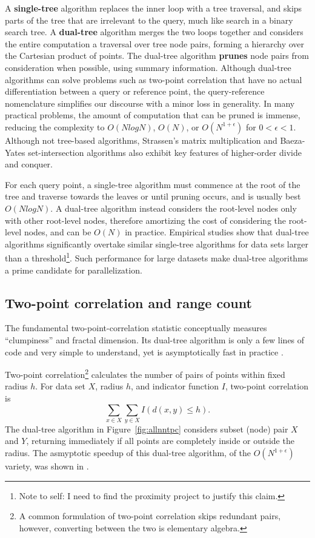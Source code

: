 \documentclass[twoside,leqno,twocolumn]{article}
\newcommand{\authornote}[1]{\footnote{Note to self: #1}}
\newcommand{\authorsnote}[1]{\authornote{#1}}
\newcommand{\fig}[1]{Figure~\ref{fig:#1}}
\newcommand{\mysub}[1]{\subsection{#1} }
\newcommand{\defterm}[1]{{\bf #1}}
\begin{document}
A \defterm{single-tree} algorithm replaces the inner loop with a tree traversal, and skips parts of the tree that are irrelevant to the query, much like search in a binary search tree.
A \defterm{dual-tree} algorithm merges the two loops together and considers the entire computation a traversal over tree node pairs, forming a hierarchy over the Cartesian product of points.
The dual-tree algorithm \defterm{prunes} node pairs from consideration when possible, using summary information.
Although dual-tree algorithms can solve problems such as two-point correlation that have no actual differentiation between a query or reference point, the query-reference nomenclature simplifies our discourse with a minor loss in generality.
In many practical problems, the amount of computation that can be pruned is immense, reducing the complexity to $O(N log N)$, $O(N)$, or $O(N^{1+\epsilon})$ for $0 < \epsilon < 1$.
Although not tree-based algorithms, Strassen's\cite{strassen} matrix multiplication and Baeza-Yates\cite{baeza_yates} set-intersection algorithms also exhibit key features of higher-order divide and conquer.

For each query point, a single-tree algorithm must commence at the root of the tree and traverse towards the leaves or until pruning occurs, and is usually best $O(N log N)$.
A dual-tree algorithm instead considers the root-level nodes only with other root-level nodes, therefore amortizing the cost of considering the root-level nodes, and can be $O(N)$ in practice.
Empirical studies show that dual-tree algorithms significantly overtake similar single-tree algorithms for data sets larger than a threshold\authorsnote{I need to find the proximity project to justify this claim.}.
Such performance for large datasets make dual-tree algorithms a prime candidate for parallelization.

\mysub{Two-point correlation and range count}
The fundamental two-point-correlation statistic conceptually measures ``clumpiness'' and fractal dimension.
Its dual-tree algorithm is only a few lines of code and very simple to understand, yet is asymptotically fast in practice \cite{gray_nbody}.

Two-point correlation\footnote{A common formulation of two-point correlation skips redundant pairs, however, converting between the two is elementary algebra.} calculates the number of pairs of points within fixed radius $h$.
For data set $X$, radius $h$, and indicator function $I$, two-point correlation is
\[\sum_{x \in X} \sum_{y \in X} I(d(x, y) \leq h).\]
\noindent
The dual-tree algorithm in \fig{allnntpc} considers subset (node) pair $X$ and $Y$, returning immediately if all points are completely inside or outside the radius.
The asmyptotic speedup of this dual-tree algorithm, of the $O(N^{1+\epsilon})$ variety, was shown in \cite{gray_nbody}.
\end{document}
